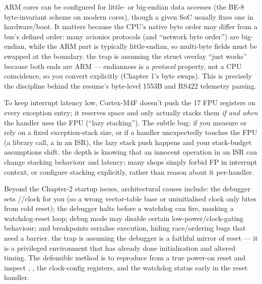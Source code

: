 ARM cores can be configured for little- or big-endian data accesses (the BE-8
byte-invariant scheme on modern cores), though a given SoC usually fixes one in
hardware/boot. It matters because the CPU's native byte order may differ from a
bus's defined order: many avionics protocols (and ``network byte order'') are
big-endian, while the ARM part is typically little-endian, so multi-byte fields
must be swapped at the boundary. \trap the trap is assuming the struct overlay
``just works'' because both ends are ARM --- endianness is a \emph{protocol}
property, not a CPU coincidence, so you convert explicitly (Chapter 1's byte
swaps). This is precisely the discipline behind the resume's byte-level 1553B
and RS422 telemetry parsing.

To keep interrupt latency low, Cortex-M4F doesn't push the 17 FPU registers on
every exception entry; it reserves space and only actually stacks them
\emph{if and when} the handler uses the FPU (``lazy stacking''). The subtle
bug: if you measure or rely on a fixed exception-stack size, or if a handler
unexpectedly touches the FPU (a library call, a  in an ISR), the
lazy stack push happens and your stack-budget assumptions shift. \trap the depth
is knowing that an innocent  operation in an ISR can change
stacking behaviour and latency; many shops simply forbid FP in interrupt
context, or configure stacking explicitly, rather than reason about it
per-handler.

Beyond the Chapter-2 startup issues, architectural causes include: the debugger
sets //clock for you (so a wrong vector-table base or
uninitialised clock only bites from cold reset); the debugger halts before a
watchdog can fire, masking a watchdog-reset loop; debug mode may disable certain
low-power/clock-gating behaviour; and breakpoints serialise execution, hiding
race/ordering bugs that need a barrier. \trap the trap is assuming the debugger
is a faithful mirror of reset --- it is a privileged environment that has
already done initialisation and altered timing. The defensible method is to
reproduce from a true power-on reset and inspect , , the
clock-config registers, and the watchdog status early in the reset handler.

